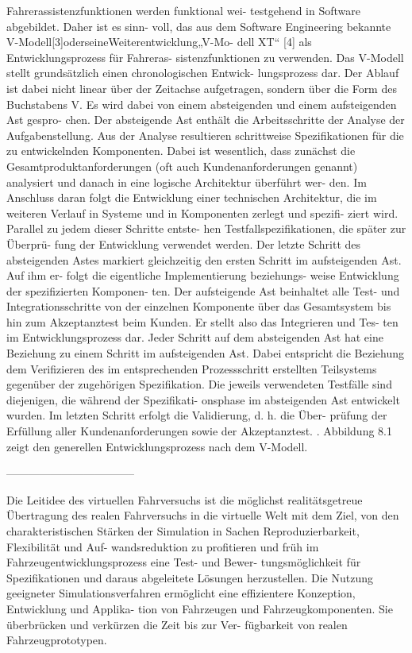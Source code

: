 Fahrerassistenzfunktionen werden funktional wei- testgehend in Software abgebildet. Daher ist es sinn- voll, das aus dem Software Engineering bekannte V-Modell[3]oderseineWeiterentwicklung„V-Mo- dell XT“ [4] als Entwicklungsprozess für Fahreras- sistenzfunktionen zu verwenden. Das V-Modell stellt grundsätzlich einen chronologischen Entwick- lungsprozess dar. Der Ablauf ist dabei nicht linear über der Zeitachse aufgetragen, sondern über die Form des Buchstabens V. Es wird dabei von einem absteigenden und einem aufsteigenden Ast gespro- chen. Der absteigende Ast enthält die Arbeitsschritte der Analyse der Aufgabenstellung. Aus der Analyse resultieren schrittweise Spezifikationen für die zu entwickelnden Komponenten. Dabei ist wesentlich, dass zunächst die Gesamtproduktanforderungen (oft auch Kundenanforderungen genannt) analysiert und danach in eine logische Architektur überführt wer- den. Im Anschluss daran folgt die Entwicklung einer technischen Architektur, die im weiteren Verlauf in Systeme und in Komponenten zerlegt und spezifi- ziert wird. Parallel zu jedem dieser Schritte entste- hen Testfallspezifikationen, die später zur Überprü- fung der Entwicklung verwendet werden. Der letzte Schritt des absteigenden Astes markiert gleichzeitig den ersten Schritt im aufsteigenden Ast. Auf ihm er- folgt die eigentliche Implementierung beziehungs- weise Entwicklung der spezifizierten Komponen- ten. Der aufsteigende Ast beinhaltet alle Test- und Integrationsschritte von der einzelnen Komponente über das Gesamtsystem bis hin zum Akzeptanztest beim Kunden. Er stellt also das Integrieren und Tes- ten im Entwicklungsprozess dar. Jeder Schritt auf dem absteigenden Ast hat eine Beziehung zu einem Schritt im aufsteigenden Ast. Dabei entspricht die Beziehung dem Verifizieren des im entsprechenden Prozessschritt erstellten Teilsystems gegenüber der zugehörigen Spezifikation. Die jeweils verwendeten Testfälle sind diejenigen, die während der Spezifikati- onsphase im absteigenden Ast entwickelt wurden. Im letzten Schritt erfolgt die Validierung, d. h. die Über- prüfung der Erfüllung aller Kundenanforderungen sowie der Akzeptanztest. . Abbildung 8.1 zeigt den generellen Entwicklungsprozess nach dem V-Modell.

-----------------------------------

Die Leitidee des virtuellen Fahrversuchs ist die möglichst realitätsgetreue Übertragung des realen Fahrversuchs in die virtuelle Welt mit dem Ziel, von den charakteristischen Stärken der Simulation in Sachen Reproduzierbarkeit, Flexibilität und Auf- wandsreduktion zu profitieren und früh im Fahrzeugentwicklungsprozess eine Test- und Bewer- tungsmöglichkeit für Spezifikationen und daraus abgeleitete Lösungen herzustellen. Die Nutzung geeigneter Simulationsverfahren ermöglicht eine effizientere Konzeption, Entwicklung und Applika- tion von Fahrzeugen und Fahrzeugkomponenten. Sie überbrücken und verkürzen die Zeit bis zur Ver- fügbarkeit von realen Fahrzeugprototypen. 

